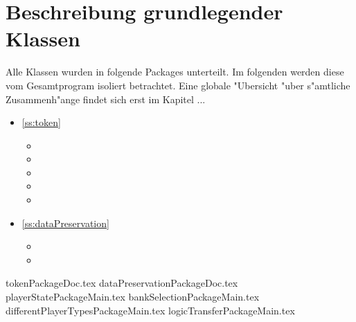 \section{Beschreibung grundlegender Klassen}
Alle Klassen wurden in folgende Packages unterteilt. Im folgenden werden diese vom Gesamtprogram isoliert betrachtet. Eine globale "Ubersicht "uber s"amtliche Zusammenh"ange findet sich erst im Kapitel ...
\begin{itemize}
	\item \ref{ss:token} 
	\begin{itemize}
		\item {}
		\item {}
		\item {}
		\item {}
		\item {}
	\end{itemize}
	\item \ref{ss:dataPreservation} 
	\begin{itemize}
		\item {}
		\item {}
	\end{itemize}
\end{itemize}
{tokenPackageDoc.tex}
\newpage
{dataPreservationPackageDoc.tex}
\newpage
{playerStatePackageMain.tex}
\newpage
{bankSelectionPackageMain.tex}
\newpage
{differentPlayerTypesPackageMain.tex}
\newpage
{logicTransferPackageMain.tex}
